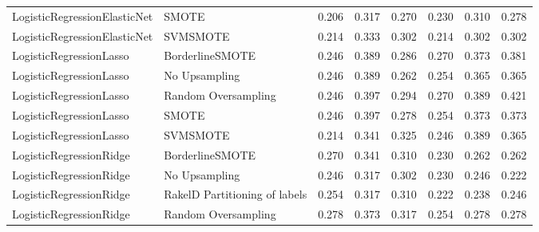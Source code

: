 \begin{tabular}{llllllll}
   LogisticRegressionElasticNet &                         SMOTE & 0.206 &                     0.317 &                 0.270 &                  0.230 &                                   0.310 &     0.278 \\
   LogisticRegressionElasticNet &                      SVMSMOTE & 0.214 &                     0.333 &                 0.302 &                  0.214 &                                   0.302 &     0.302 \\
        LogisticRegressionLasso &               BorderlineSMOTE & 0.246 &                     0.389 &                 0.286 &                  0.270 &                                   0.373 &     0.381 \\
        LogisticRegressionLasso &                 No Upsampling & 0.246 &                     0.389 &                 0.262 &                  0.254 &                                   0.365 &     0.365 \\
        LogisticRegressionLasso &           Random Oversampling & 0.246 &                     0.397 &                 0.294 &                  0.270 &                                   0.389 &     0.421 \\
        LogisticRegressionLasso &                         SMOTE & 0.246 &                     0.397 &                 0.278 &                  0.254 &                                   0.373 &     0.373 \\
        LogisticRegressionLasso &                      SVMSMOTE & 0.214 &                     0.341 &                 0.325 &                  0.246 &                                   0.389 &     0.365 \\
        LogisticRegressionRidge &               BorderlineSMOTE & 0.270 &                     0.341 &                 0.310 &                  0.230 &                                   0.262 &     0.262 \\
        LogisticRegressionRidge &                 No Upsampling & 0.246 &                     0.317 &                 0.302 &                  0.230 &                                   0.246 &     0.222 \\
        LogisticRegressionRidge & RakelD Partitioning of labels & 0.254 &                     0.317 &                 0.310 &                  0.222 &                                   0.238 &     0.246 \\
        LogisticRegressionRidge &           Random Oversampling & 0.278 &                     0.373 &                 0.317 &                  0.254 &                                   0.278 &     0.278 \\

\end{tabular}
